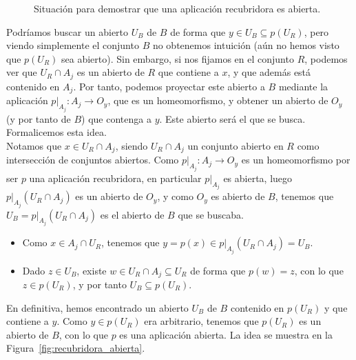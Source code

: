 \begin{ejercicio}
\begin{figure}[ht]
        \caption{Situación para demostrar que una aplicación recubridora es abierta.}
        \label{fig:recubridora_abierta_base}
    \end{figure}

    Podríamos buscar un abierto $U_B$ de $B$ de forma que $y\in U_B \subseteq p(U_R)$, pero viendo simplemente el conjunto $B$ no obtenemos intuición (aún no hemos visto que $p(U_R)$ sea abierto). Sin embargo, si nos fijamos en el conjunto $R$, podemos ver que $U_R\cap A_j$ es un abierto de $R$ que contiene a $x$, y que además está contenido en $A_j$. Por tanto, podemos proyectar este abierto a $B$ mediante la aplicación $p\big|_{A_j}:A_j\to O_y$, que es un homeomorfismo, y obtener un abierto de $O_y$ (y por tanto de $B$) que contenga a $y$. Este abierto será el que se busca. Formalicemos esta idea.\\


    Notamos que $x\in U_R\cap A_j$, siendo $U_R\cap A_j$ un conjunto abierto en $R$ como intersección de conjuntos abiertos. Como $p\big|_{A_j}:A_j\to O_y$ es un homeomorfismo por ser $p$ una aplicación recubridora, en particular $p\big|_{A_j}$ es abierta, luego $p\big|_{A_j}(U_R\cap A_j)$ es un abierto de $O_y$, y como $O_y$ es abierto de $B$, tenemos que $U_B =p\big|_{A_j}(U_R\cap A_j)$ es el abierto de $B$ que se buscaba.
    \begin{itemize}
        \item Como $x\in A_j\cap U_R$, tenemos que $y = p(x) \in p\big|_{A_j}(U_R\cap A_j) = U_B$.
        \item Dado $z\in U_B$, existe $w\in U_R\cap A_j\subseteq U_R$ de forma que $p(w) = z$, con lo que $z\in p(U_R)$, y por tanto $U_B \subseteq p(U_R)$.
    \end{itemize}

    En definitiva, hemos encontrado un abierto $U_B$ de $B$ contenido en $p(U_R)$ y que contiene a $y$. Como $y\in p(U_R)$ era arbitrario, tenemos que $p(U_R)$ es un abierto de $B$, con lo que $p$ es una aplicación abierta. La idea se muestra en la Figura~\ref{fig:recubridora_abierta}.
    \begin{figure}[ht]
        \centering
\end{figure}
\end{ejercicio}
